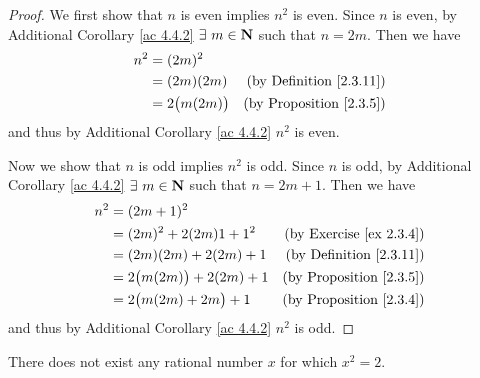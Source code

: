 \begin{proof}
    We first show that \(n\) is even implies \(n^2\) is even.
    Since \(n\) is even, by Additional Corollary \ref{ac 4.4.2} \(\exists\ m \in \mathbf{N}\) such that \(n = 2m\).
    Then we have
    \begin{align*}
        n^2 & = (2m)^2                                                 \\
            & = (2m)(2m)         & \text{(by Definition \ref{2.3.11})} \\
            & = 2\big(m(2m)\big) & \text{(by Proposition \ref{2.3.5})}
    \end{align*}
    and thus by Additional Corollary \ref{ac 4.4.2} \(n^2\) is even.

    Now we show that \(n\) is odd implies \(n^2\) is odd.
    Since \(n\) is odd, by Additional Corollary \ref{ac 4.4.2} \(\exists\ m \in \mathbf{N}\) such that \(n = 2m + 1\).
    Then we have
    \begin{align*}
        n^2 & = (2m + 1)^2                                                         \\
            & = (2m)^2 + 2(2m)1 + 1^2        & \text{(by Exercise \ref{ex 2.3.4})} \\
            & = (2m)(2m) + 2(2m) + 1         & \text{(by Definition \ref{2.3.11})} \\
            & = 2\big(m(2m)\big) + 2(2m) + 1 & \text{(by Proposition \ref{2.3.5})} \\
            & = 2\big(m(2m) + 2m\big) + 1    & \text{(by Proposition \ref{2.3.4})}
    \end{align*}
    and thus by Additional Corollary \ref{ac 4.4.2} \(n^2\) is odd.
\end{proof}

\begin{proposition}\label{4.4.4}
    There does not exist any rational number \(x\) for which \(x^2 = 2\).
\end{proposition}

